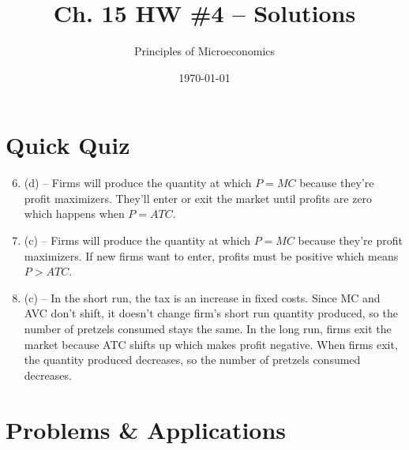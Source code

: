 \documentclass{article}
\title{Ch. 15 HW \#4 -- Solutions}
\author{Principles of Microeconomics}
\date{\today}
\begin{document}
\maketitle

\section*{Quick Quiz}

\begin{enumerate}

\setcounter{enumi}{5}
\item (d) -- Firms will produce the quantity at which $P = MC$ because they're profit maximizers. They'll enter or exit the market until profits are zero which happens when $P = ATC$.

\item (c) -- Firms will produce the quantity at which $P = MC$ because they're profit maximizers. If new firms want to enter, profits must be positive which means $P > ATC$.

\item (c) -- In the short run, the tax is an increase in fixed costs. Since MC and AVC don't shift, it doesn't change firm's short run quantity produced, so the number of pretzels consumed stays the same. In the long run, firms exit the market because ATC shifts up which makes profit negative. When firms exit, the quantity produced decreases, so the number of pretzels consumed decreases.

\end{enumerate}

\section*{Problems \& Applications}
\end{document}
